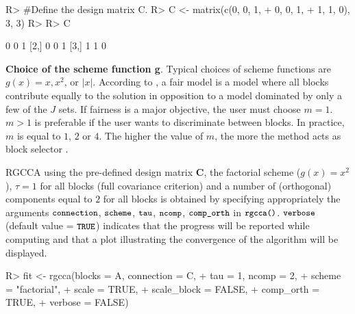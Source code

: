 \documentclass[
]{jss}
\begin{document}
\footnotesize

\begin{CodeChunk}
\begin{CodeInput}
R> #Define the design matrix C.
R> C <- matrix(c(0, 0, 1,
+               0, 0, 1,
+               1, 1, 0), 3, 3)
R> 
R> C
\end{CodeInput}
\begin{CodeOutput}
     [,1] [,2] [,3]
[1,]    0    0    1
[2,]    0    0    1
[3,]    1    1    0
\end{CodeOutput}
\end{CodeChunk}

\normalsize

\textbf{Choice of the scheme function g}. Typical choices of scheme
functions are \(g(x) = x, x^2\), or \(\vert x \vert\). According to
\cite{VandeGeer1984}, a fair model is a model where all blocks
contribute equally to the solution in opposition to a model dominated by
only a few of the \(J\) sets. If fairness is a major objective, the user
must choose \(m=1\). \(m>1\) is preferable if the user wants to
discriminate between blocks. In practice, \(m\) is equal to \(1\), \(2\)
or \(4\). The higher the value of \(m\), the more the method acts as
block selector \citep{Tenenhaus2017}.

RGCCA using the pre-defined design matrix \(\mathbf{C}\), the factorial
scheme (\(g(x) = x^2\)), \(\tau = 1\) for all blocks (full covariance
criterion) and a number of (orthogonal) components equal to \(2\) for
all blocks is obtained by specifying appropriately the arguments
\(\small{\texttt{connection}}\), \(\small{\texttt{scheme}}\),
\(\small{\texttt{tau}}\), \(\small{\texttt{ncomp}}\),
\(\small{\texttt{comp\_orth}}\) in \(\small{\texttt{rgcca()}}\).
\(\small{\texttt{verbose}}\) (default value = \(\small{\texttt{TRUE}}\))
indicates that the progress will be reported while computing and that a
plot illustrating the convergence of the algorithm will be displayed.

\footnotesize

\begin{CodeChunk}
\begin{CodeInput}
R> fit <- rgcca(blocks = A, connection = C,
+              tau = 1, ncomp = 2,
+              scheme = "factorial",
+              scale = TRUE,
+              scale_block = FALSE,
+              comp_orth = TRUE,
+              verbose = FALSE)
\end{CodeInput}
\end{CodeChunk}
\end{document}
